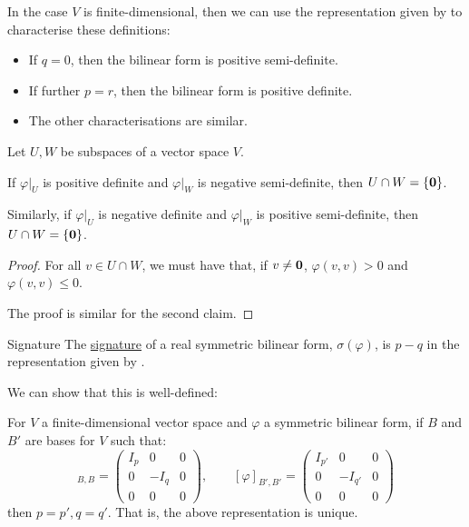 \documentclass[../Main.tex]{subfiles}
\begin{document}
In the case $V$ is finite-dimensional, then we can use the representation given by  to characterise these definitions:
\begin{itemize}
    \item If $q = 0$, then the bilinear form is positive semi-definite.
    \item If further $p = r$, then the bilinear form is positive definite.
    \item The other characterisations are similar.
\end{itemize}
\begin{lemma}
    Let $U, W$ be subspaces of a vector space $V$.

    If $\varphi |_U$ is positive definite and $\varphi |_W$ is negative semi-definite, then $U \cap W = \{\boldsymbol{0}\}$.

    Similarly, if $\varphi |_U$ is negative definite and $\varphi |_W$ is positive semi-definite, then $U \cap W = \{\boldsymbol{0}\}$.
    \label{lemBFRestrictDefness}
\end{lemma}
\begin{proof}
    For all $v \in U \cap W$, we must have that, if $v \neq \boldsymbol{0}$, $\varphi(v, v) > 0$ and $\varphi(v, v) \leq 0$. \contradiction

    The proof is similar for the second claim.
\end{proof}
\begin{definition}{Signature}
    The \underline{signature} of a real symmetric bilinear form, $\sigma(\varphi)$, is $p - q$ in the representation given by .
\end{definition}
We can show that this is well-defined:
\begin{theorem}
    For $V$ a finite-dimensional vector space and $\varphi$ a symmetric bilinear form, if $B$ and $B'$ are bases for $V$ such that:
    \begin{equation*}
        [\varphi]_{B, B} =
        \begin{pmatrix}
            I_p & 0 & 0 \\
            0 & -I_q & 0 \\
            0 & 0 & 0
        \end{pmatrix}
        , \qquad [\varphi]_{B', B'} =
        \begin{pmatrix}
            I_{p'} & 0 & 0 \\
            0 & -I_{q'} & 0 \\
            0 & 0 & 0
        \end{pmatrix}
    \end{equation*}
    then $p = p', q = q'$. That is, the above representation is unique.
    \label{thmSylvesterInertia}
\end{theorem}
\end{document}
